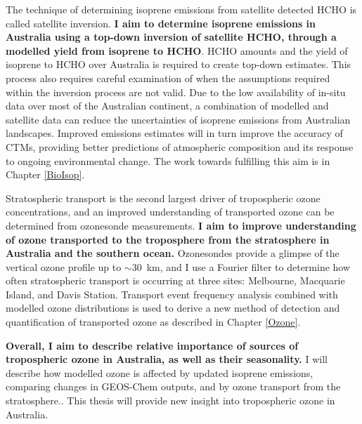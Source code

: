   The technique of determining isoprene emissions from satellite detected HCHO is called satellite inversion.
  \textbf{I aim to determine isoprene emissions in Australia using a top-down inversion of satellite HCHO, through a modelled yield from isoprene to HCHO}.
  HCHO amounts and the yield of isoprene to HCHO over Australia is required to create top-down estimates.
  This process also requires careful examination of when the assumptions required within the inversion process are not valid.
  Due to the low availability of in-situ data over most of the Australian continent, a combination of modelled and satellite data can reduce the uncertainties of isoprene emissions from Australian landscapes.
  Improved emissions estimates will in turn improve the accuracy of CTMs, providing better predictions of atmospheric composition and its response to ongoing environmental change.
  The work towards fulfilling this aim is in Chapter \ref{BioIsop}.
  
  Stratospheric transport is the second largest driver of tropospheric ozone concentrations, and an improved understanding of transported ozone can be determined from ozonesonde measurements.
  \textbf{I aim to improve understanding of ozone transported to the troposphere from the stratosphere in Australia and the southern ocean.}
  Ozonesondes provide a glimpse of the vertical ozone profile up to $\sim 30$~km, and I use a Fourier filter to determine how often stratospheric transport is occurring at three sites: Melbourne, Macquarie Island, and Davis Station. 
  Transport event frequency analysis combined with modelled ozone distributions is used to derive a new method of detection and quantification of transported ozone as described in Chapter \ref{Ozone}.
  
  
  \textbf{Overall, I aim to describe relative importance of sources of tropospheric ozone in Australia, as well as their seasonality.}
  I will describe how modelled ozone is affected by updated isoprene emissions, comparing changes in GEOS-Chem outputs, and by ozone transport from the stratosphere..
  This thesis will provide new insight into tropospheric ozone in Australia.
  
